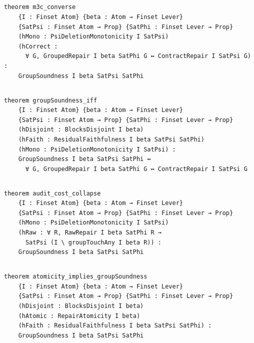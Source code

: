 \subsection{}
\begin{Verbatim}[fontsize=\scriptsize]
theorem m3c_converse
    {I : Finset Atom} {beta : Atom → Finset Lever}
    {SatPsi : Finset Atom → Prop} {SatPhi : Finset Lever → Prop}
    (hMono : PsiDeletionMonotonicity I SatPsi)
    (hCorrect :
      ∀ G, GroupedRepair I beta SatPhi G ↔ ContractRepair I SatPsi G) :
    GroupSoundness I beta SatPsi SatPhi
\end{Verbatim}

\subsection{}
\begin{Verbatim}[fontsize=\scriptsize]
theorem groupSoundness_iff
    {I : Finset Atom} {beta : Atom → Finset Lever}
    {SatPsi : Finset Atom → Prop} {SatPhi : Finset Lever → Prop}
    (hDisjoint : BlocksDisjoint I beta)
    (hFaith : ResidualFaithfulness I beta SatPsi SatPhi)
    (hMono : PsiDeletionMonotonicity I SatPsi) :
    GroupSoundness I beta SatPsi SatPhi ↔
      ∀ G, GroupedRepair I beta SatPhi G ↔ ContractRepair I SatPsi G
\end{Verbatim}

\subsection{}
\begin{Verbatim}[fontsize=\scriptsize]
theorem audit_cost_collapse
    {I : Finset Atom} {beta : Atom → Finset Lever}
    {SatPsi : Finset Atom → Prop} {SatPhi : Finset Lever → Prop}
    (hMono : PsiDeletionMonotonicity I SatPsi)
    (hRaw : ∀ R, RawRepair I beta SatPhi R →
      SatPsi (I \ groupTouchAny I beta R)) :
    GroupSoundness I beta SatPsi SatPhi
\end{Verbatim}

\subsection{}
\begin{Verbatim}[fontsize=\scriptsize]
theorem atomicity_implies_groupSoundness
    {I : Finset Atom} {beta : Atom → Finset Lever}
    {SatPsi : Finset Atom → Prop} {SatPhi : Finset Lever → Prop}
    (hDisjoint : BlocksDisjoint I beta)
    (hAtomic : RepairAtomicity I beta)
    (hFaith : ResidualFaithfulness I beta SatPsi SatPhi) :
    GroupSoundness I beta SatPsi SatPhi
\end{Verbatim}

